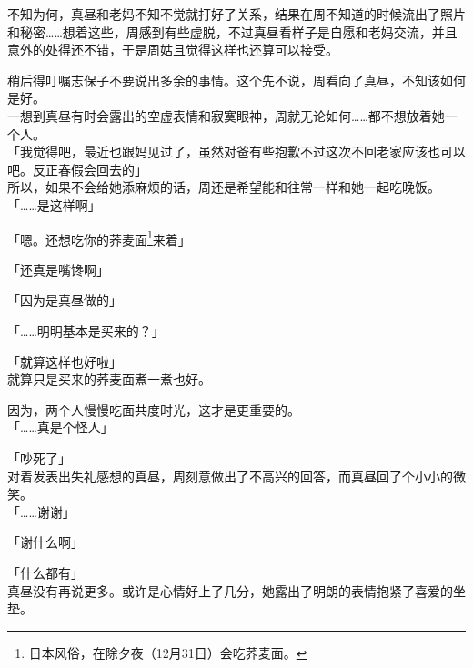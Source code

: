 不知为何，真昼和老妈不知不觉就打好了关系，结果在周不知道的时候流出了照片和秘密……想着这些，周感到有些虚脱，不过真昼看样子是自愿和老妈交流，并且意外的处得还不错，于是周姑且觉得这样也还算可以接受。

稍后得叮嘱志保子不要说出多余的事情。这个先不说，周看向了真昼，不知该如何是好。\\

一想到真昼有时会露出的空虚表情和寂寞眼神，周就无论如何……都不想放着她一个人。\\

「我觉得吧，最近也跟妈见过了，虽然对爸有些抱歉不过这次不回老家应该也可以吧。反正春假会回去的」\\

所以，如果不会给她添麻烦的话，周还是希望能和往常一样和她一起吃晚饭。\\

「……是这样啊」

「嗯。还想吃你的荞麦面\footnote{日本风俗，在除夕夜（12月31日）会吃荞麦面。}来着」

「还真是嘴馋啊」

「因为是真昼做的」

「……明明基本是买来的？」

「就算这样也好啦」\\

就算只是买来的荞麦面煮一煮也好。

因为，两个人慢慢吃面共度时光，这才是更重要的。\\

「……真是个怪人」

「吵死了」\\

对着发表出失礼感想的真昼，周刻意做出了不高兴的回答，而真昼回了个小小的微笑。\\

「……谢谢」

「谢什么啊」

「什么都有」\\

真昼没有再说更多。或许是心情好上了几分，她露出了明朗的表情抱紧了喜爱的坐垫。
